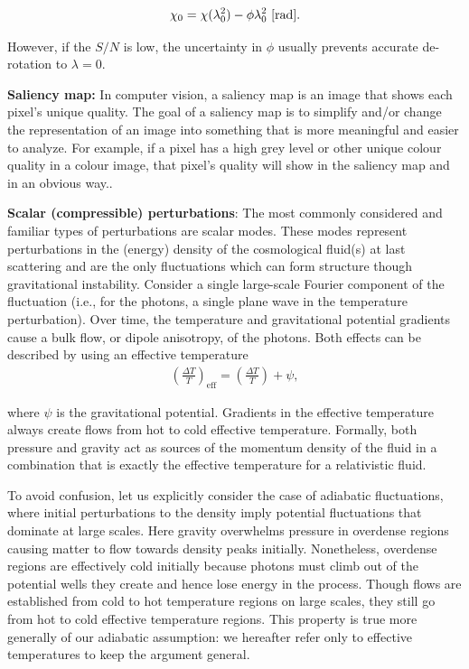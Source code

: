 \documentclass[a4paper,10pt]{article}
\begin{document}
\begin{align*}
    \chi_0 = \chi(\lambda_0^2) - \phi\lambda_0^2 ~ [{\rm rad}].
\end{align*}

{\noindent}However, if the $S/N$ is low, the uncertainty in $\phi$ usually prevents accurate de-rotation to $\lambda=0$. 

{\noindent}\textbf{Saliency map:} In computer vision, a saliency map is an image that shows each pixel's unique quality. The goal of a saliency map is to simplify and/or change the representation of an image into something that is more meaningful and easier to analyze. For example, if a pixel has a high grey level or other unique colour quality in a colour image, that pixel's quality will show in the saliency map and in an obvious way..

{\noindent}\textbf{Scalar (compressible) perturbations}: The most commonly considered and familiar types of perturbations are scalar modes. These modes represent perturbations in the (energy) density of the cosmological fluid(s) at last scattering and are the only fluctuations which can form structure though gravitational instability. Consider a single large-scale Fourier component of the fluctuation (i.e., for the photons, a single plane wave in the temperature perturbation). Over time, the temperature and gravitational potential gradients cause a bulk flow, or dipole anisotropy, of the photons. Both effects can be described by using an effective temperature
\begin{align*}
    \left(\frac{\Delta T}{T}\right)_\mathrm{eff} = \left(\frac{\Delta T}{T}\right) + \psi,
\end{align*}

{\noindent}where $\psi$ is the gravitational potential. Gradients in the effective temperature always create flows from hot to cold effective temperature. Formally, both pressure and gravity act as sources of the momentum density of the fluid in a combination that is exactly the effective temperature for a relativistic fluid.

{\noindent}To avoid confusion, let us explicitly consider the case of adiabatic fluctuations, where initial perturbations to the density imply potential fluctuations that dominate at large scales. Here gravity overwhelms pressure in overdense regions causing matter to flow towards density peaks initially. Nonetheless, overdense regions are effectively cold initially because photons must climb out of the potential wells they create and hence lose energy in the process. Though flows are established from cold to hot temperature regions on large scales, they still go from hot to cold effective temperature regions. This property is true more generally of our adiabatic assumption: we hereafter refer only to effective temperatures to keep the argument general.
\end{document}
